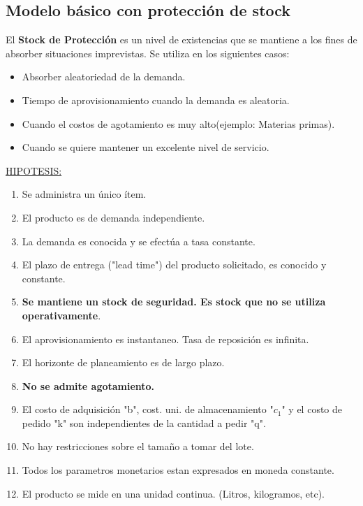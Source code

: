 \documentclass{article}
\begin{document}
\newpage
\subsection{Modelo básico con protección de stock}

El \textbf{Stock de Protección} es un nivel de existencias que se mantiene a los fines de absorber situaciones imprevistas.
Se utiliza en los siguientes casos:

\begin{itemize}
    \item Absorber aleatoriedad de la demanda.
    \item Tiempo de aprovisionamiento cuando la demanda es aleatoria.
    \item Cuando el costos de agotamiento es muy alto(ejemplo: Materias primas).
    \item Cuando se quiere mantener un excelente nivel de servicio.
\end{itemize}

\noindent
\underline{HIPOTESIS:}
\begin{enumerate}
    \item Se administra un único ítem.
    \item El producto es de demanda independiente.
    \item La demanda es conocida y se efectúa a tasa constante.
    \item El plazo de entrega ("lead time") del producto solicitado, es conocido y constante.
    \item \textbf{Se mantiene un stock de seguridad. Es stock que no se utiliza operativamente}.
    \item El aprovisionamiento es instantaneo. Tasa de reposición es infinita.
    \item El horizonte de planeamiento es de largo plazo.
    \item \textbf{No se admite agotamiento.}
    \item El costo de adquisición "b", cost. uni. de almacenamiento "\(c_1\)" y el costo de pedido "k" son independientes de la cantidad a pedir "q".
    \item No hay restricciones sobre el tamaño a tomar del lote.
    \item Todos los parametros monetarios estan expresados en moneda constante.
    \item El producto se mide en una unidad continua. (Litros, kilogramos, etc).
\end{enumerate}
\end{document}
